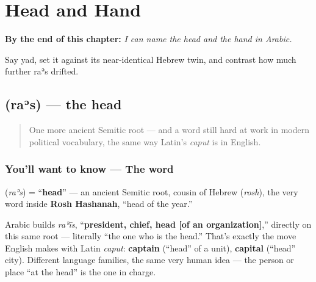 
\chapter{Head and Hand}
\label{ch:ar-head-and-hand}

\begin{chapteropening}
\textbf{By the end of this chapter:} \emph{I can name the head and the hand in Arabic.}

Say yad, set it against its near-identical Hebrew twin, and contrast how much further raʾs drifted.
\end{chapteropening}

\section[\texorpdfstring{\ar{رأس} (raʾs)}{رأس (raʾs)}]{ (raʾs) — the head}

\label{lesson:AR-C11-ras}



\begin{quote}
One more ancient Semitic root — and a word still hard at work in modern political vocabulary, the same way Latin's \emph{caput} is in English.
\end{quote}

\subsection*{You'll want to know — The word}
\textbf{} (\emph{raʾs}) = \textquotedblleft{}\textbf{head}\textquotedblright{} — an ancient Semitic root, cousin of Hebrew \textbf{} (\emph{rosh}), the very word inside \textbf{Rosh Hashanah}, \textquotedblleft{}head of the year.\textquotedblright{}

\begin{culture}
Arabic builds \emph{raʾīs}, \textquotedblleft{}\textbf{president, chief, head {[}of an organization{]}},\textquotedblright{} directly on this same root — literally \textquotedblleft{}the one who is the head.\textquotedblright{} That's exactly the move English makes with Latin \emph{caput}: \textbf{captain} (\textquotedblleft{}head\textquotedblright{} of a unit), \textbf{capital} (\textquotedblleft{}head\textquotedblright{} city). Different language families, the same very human idea — the person or place \textquotedblleft{}at the head\textquotedblright{} is the one in charge.
\end{culture}

